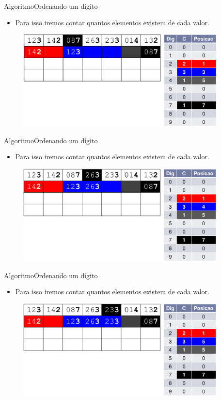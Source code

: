 \documentclass[aspectratio=169]{beamer}
\begin{document}
\begin{frame}{Algoritmo}{Ordenando um dígito}
\begin{itemize}
\item Para isso iremos contar quantos elementos existem de cada valor.
\end{itemize}
\begin{figure}[!h]
  \centering
  \includegraphics[width=300pt]{imgs/radix6.png}
  \label{radix6}
\end{figure}
\end{frame}


\begin{frame}{Algoritmo}{Ordenando um dígito}
\begin{itemize}
\item Para isso iremos contar quantos elementos existem de cada valor.
\end{itemize}
\begin{figure}[!h]
  \centering
  \includegraphics[width=300pt]{imgs/radix7.png}
  \label{radix7}
\end{figure}
\end{frame}


\begin{frame}{Algoritmo}{Ordenando um dígito}
\begin{itemize}
\item Para isso iremos contar quantos elementos existem de cada valor.
\end{itemize}
\begin{figure}[!h]
  \centering
  \includegraphics[width=300pt]{imgs/radix8.png}
  \label{radix8}
\end{figure}
\end{frame}
\end{document}
